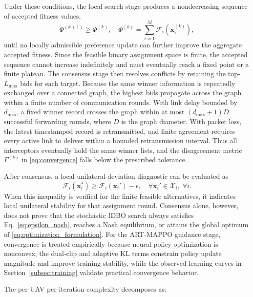 \documentclass[lettersize,journal]{IEEEtran}
\begin{document}
Under these conditions, the local search stage produces a nondecreasing sequence of accepted
fitness values,
\begin{equation}
\label{eq:fitness_monotonic}
\Phi^{(k+1)} \geq \Phi^{(k)}, \quad
\Phi^{(k)}=\sum_{i=1}^{M}\mathcal{F}_i(\mathbf{x}_i^{(k)}),
\end{equation}
until no locally admissible preference update can further improve the aggregate accepted
fitness. Since the feasible binary assignment space is finite, the accepted sequence cannot
increase indefinitely and must eventually reach a fixed point or a finite plateau. The
consensus stage then resolves conflicts by retaining the top-$L_{\max}$ bids for each target.
Because the same winner information is repeatedly exchanged over a connected graph, the
highest bids propagate across the graph within a finite number of communication rounds.
With link delay bounded by \(d_{\max}\), a fixed winner record crosses the
graph within at most \((d_{\max}+1)D\) successful forwarding rounds, where
\(D\) is the graph diameter. With packet loss, the latest timestamped record is
retransmitted, and finite agreement requires every active link to deliver
within a bounded retransmission interval. Thus all interceptors eventually
hold the same winner lists, and the disagreement metric
$\Gamma^{(k)}$ in \eqref{eq:convergence} falls below the prescribed tolerance.

After consensus, a local unilateral-deviation diagnostic can be evaluated as
\begin{equation}
\label{eq:epsilon_nash}
\mathcal{F}_i(\mathbf{x}_i^{*})
\geq \mathcal{F}_i(\mathbf{x}_i')-\epsilon,\quad
\forall \mathbf{x}_i'\in\mathcal{X}_i,\;\forall i .
\end{equation}
When this inequality is verified for the finite feasible alternatives, it
indicates local unilateral stability for that assignment round. Consensus
alone, however, does not prove that the stochastic IDBO search always satisfies
Eq.~\eqref{eq:epsilon_nash}, reaches a Nash equilibrium, or attains the global
optimum of \eqref{eq:optimization_formulation}. For the
ART-MAPPO guidance stage, convergence is treated empirically because neural policy
optimization is nonconvex; the dual-clip and adaptive KL terms constrain policy update
magnitude and improve training stability, while the observed learning curves in
Section~\ref{subsec:training} validate practical convergence behavior.

The per-UAV per-iteration complexity decomposes as:
\end{document}
